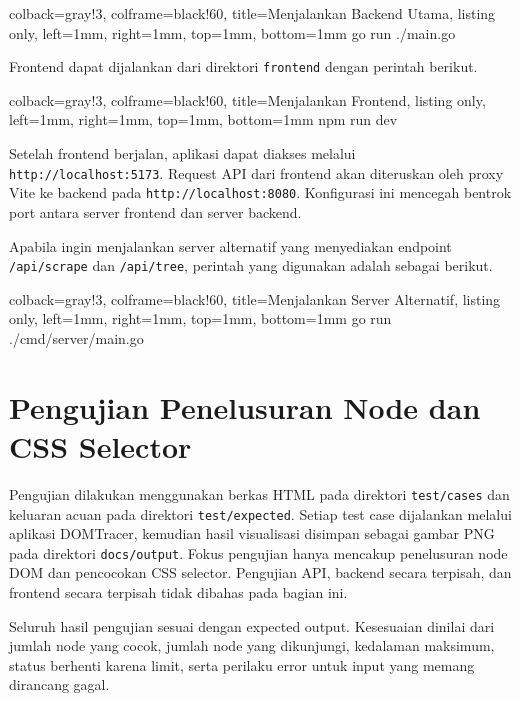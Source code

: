 \begin{tcblisting}{
        colback=gray!3,
        colframe=black!60,
        title=Menjalankan Backend Utama,
        listing only,
        left=1mm,
        right=1mm,
        top=1mm,
        bottom=1mm
    }
    go run ./main.go
\end{tcblisting}

Frontend dapat dijalankan dari direktori \texttt{frontend} dengan perintah berikut.

\begin{tcblisting}{
        colback=gray!3,
        colframe=black!60,
        title=Menjalankan Frontend,
        listing only,
        left=1mm,
        right=1mm,
        top=1mm,
        bottom=1mm
    }
    npm run dev
\end{tcblisting}

Setelah frontend berjalan, aplikasi dapat diakses melalui \texttt{http://localhost:5173}. Request API dari frontend akan diteruskan oleh proxy Vite ke backend pada \texttt{http://localhost:8080}. Konfigurasi ini mencegah bentrok port antara server frontend dan server backend.

Apabila ingin menjalankan server alternatif yang menyediakan endpoint \texttt{/api/scrape} dan \texttt{/api/tree}, perintah yang digunakan adalah sebagai berikut.

\begin{tcblisting}{
        colback=gray!3,
        colframe=black!60,
        title=Menjalankan Server Alternatif,
        listing only,
        left=1mm,
        right=1mm,
        top=1mm,
        bottom=1mm
    }
    go run ./cmd/server/main.go
\end{tcblisting}

\section{Pengujian Penelusuran Node dan CSS Selector}

Pengujian dilakukan menggunakan berkas HTML pada direktori \texttt{test/cases} dan keluaran acuan pada direktori \texttt{test/expected}. Setiap test case dijalankan melalui aplikasi DOMTracer, kemudian hasil visualisasi disimpan sebagai gambar PNG pada direktori \texttt{docs/output}. Fokus pengujian hanya mencakup penelusuran node DOM dan pencocokan CSS selector. Pengujian API, backend secara terpisah, dan frontend secara terpisah tidak dibahas pada bagian ini.

Seluruh hasil pengujian sesuai dengan expected output. Kesesuaian dinilai dari jumlah node yang cocok, jumlah node yang dikunjungi, kedalaman maksimum, status berhenti karena limit, serta perilaku error untuk input yang memang dirancang gagal.

